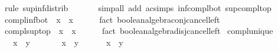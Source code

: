 \begin{isabellebody}
\ {\isacharparenleft}{\kern0pt}rule\ sup{\isacharunderscore}{\kern0pt}inf{\isacharunderscore}{\kern0pt}distrib{}{\isacharparenright}{\kern0pt}\isanewline
\ \ \ \ \ \isamarkupfalse%
\ {\isacharparenleft}{\kern0pt}simp{\isacharunderscore}{\kern0pt}all\ add{\isacharcolon}{\kern0pt}\ ac{\isacharunderscore}{\kern0pt}simps\ inf{\isacharunderscore}{\kern0pt}compl{\isacharunderscore}{\kern0pt}bot\ sup{\isacharunderscore}{\kern0pt}compl{\isacharunderscore}{\kern0pt}top{\isacharparenright}{\kern0pt}\isanewline
\ \ \isamarkupfalse%
%
\endisatagproof
{\isafoldproof}%
%
\isadelimproof
\isanewline
%
\endisadelimproof
\isanewline
{}\isamarkupfalse%
\ compl{\isacharunderscore}{\kern0pt}inf{\isacharunderscore}{\kern0pt}bot{\isacharcolon}{\kern0pt}\ {\isachardoublequoteopen}{\isacharminus}{\kern0pt}\ x\ {\isasymsqinter}\ x\ {\isacharequal}{\kern0pt}\ {\isasymbottom}{\isachardoublequoteclose}\isanewline
%
\isadelimproof
\ \ %
\endisadelimproof
%
\isatagproof
{}\isamarkupfalse%
\ {\isacharparenleft}{\kern0pt}fact\ boolean{\isacharunderscore}{\kern0pt}algebra{\isachardot}{\kern0pt}conj{\isacharunderscore}{\kern0pt}cancel{\isacharunderscore}{\kern0pt}left{\isacharparenright}{\kern0pt}%
\endisatagproof
{\isafoldproof}%
%
\isadelimproof
\isanewline
%
\endisadelimproof
\isanewline
{}\isamarkupfalse%
\ compl{\isacharunderscore}{\kern0pt}sup{\isacharunderscore}{\kern0pt}top{\isacharcolon}{\kern0pt}\ {\isachardoublequoteopen}{\isacharminus}{\kern0pt}\ x\ {\isasymsqunion}\ x\ {\isacharequal}{\kern0pt}\ {\isasymtop}{\isachardoublequoteclose}\isanewline
%
\isadelimproof
\ \ %
\endisadelimproof
%
\isatagproof
{}\isamarkupfalse%
\ {\isacharparenleft}{\kern0pt}fact\ boolean{\isacharunderscore}{\kern0pt}algebra{\isachardot}{\kern0pt}disj{\isacharunderscore}{\kern0pt}cancel{\isacharunderscore}{\kern0pt}left{\isacharparenright}{\kern0pt}%
\endisatagproof
{\isafoldproof}%
%
\isadelimproof
\isanewline
%
\endisadelimproof
\isanewline
{}\isamarkupfalse%
\ compl{\isacharunderscore}{\kern0pt}unique{\isacharcolon}{\kern0pt}\isanewline
\ \ \ {\isachardoublequoteopen}x\ {\isasymsqinter}\ y\ {\isacharequal}{\kern0pt}\ {\isasymbottom}{\isachardoublequoteclose}\isanewline
\ \ \ \ \ {\isachardoublequoteopen}x\ {\isasymsqunion}\ y\ {\isacharequal}{\kern0pt}\ {\isasymtop}{\isachardoublequoteclose}\isanewline
\ \ \ {\isachardoublequoteopen}{\isacharminus}{\kern0pt}\ x\ {\isacharequal}{\kern0pt}\ y{\isachardoublequoteclose}\isanewline

\end{isabellebody}
